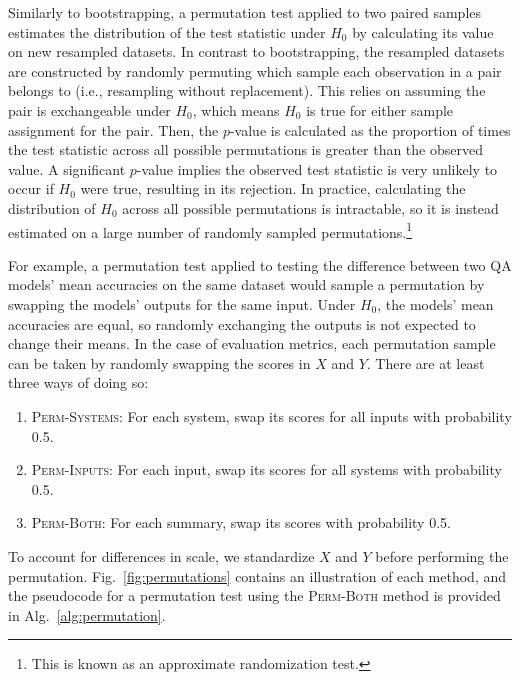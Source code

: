 

Similarly to bootstrapping, a permutation test applied to two paired samples estimates the distribution of the test statistic under $H_0$ by calculating its value on new resampled datasets.
In contrast to bootstrapping, the resampled datasets are constructed by randomly permuting which sample each observation in a pair belongs to (i.e., resampling without replacement).
This relies on assuming the pair is exchangeable under $H_0$, which means $H_0$ is true for either sample assignment for the pair.
Then, the $p$-value is calculated as the proportion of times the test statistic across all possible permutations is greater than the observed value.
A significant $p$-value implies the observed test statistic is very unlikely to occur if $H_0$ were true, resulting in its rejection.
In practice, calculating the distribution of $H_0$ across all possible permutations is intractable, so it is instead estimated on a large number of randomly sampled permutations.\footnote{
    This is known as an approximate randomization test.
}



For example, a permutation test applied to testing the difference between two QA models' mean accuracies on the same dataset would sample a permutation by swapping the models' outputs for the same input.
Under $H_0$, the models' mean accuracies are equal, so randomly exchanging the outputs is not expected to change their means.
In the case of evaluation metrics, each permutation sample can be taken by randomly swapping the scores in $X$ and $Y$.
There are at least three ways of doing so:
\begin{enumerate}
    \item \textsc{Perm-Systems}: For each system, swap its scores for all inputs with probability 0.5.
    \item \textsc{Perm-Inputs}: For each input, swap its scores for all systems with probability 0.5.
    \item \textsc{Perm-Both}: For each summary, swap its scores with probability 0.5.
\end{enumerate}
To account for differences in scale, we standardize $X$ and $Y$ before performing the permutation.
Fig.~\ref{fig:permutations} contains an illustration of each method, and the pseudocode for a permutation test using the \textsc{Perm-Both} method is provided in Alg.~\ref{alg:permutation}.

